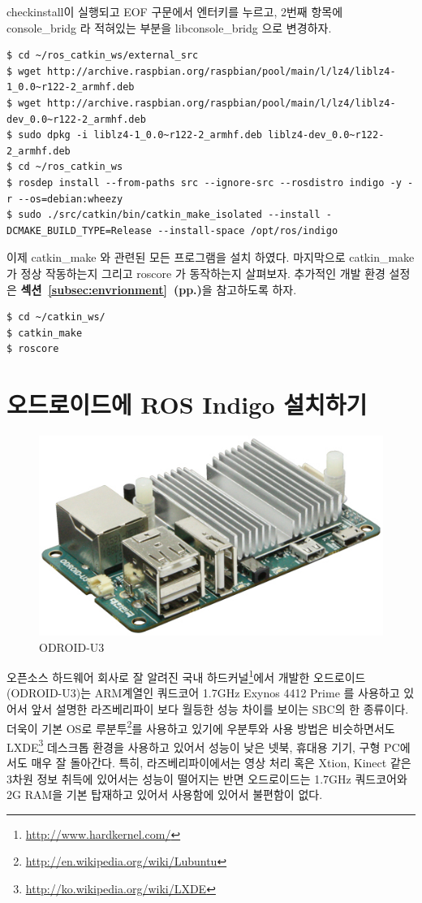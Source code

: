 checkinstall이 실행되고 EOF 구문에서 엔터키를 누르고, 2번째 항목에 console\_bridg 라 적혀있는 부분을 libconsole\_bridg 으로 변경하자.

\vspace{\baselineskip}
\begin{lstlisting}[language=ROS]
$ cd ~/ros_catkin_ws/external_src
$ wget http://archive.raspbian.org/raspbian/pool/main/l/lz4/liblz4-1_0.0~r122-2_armhf.deb
$ wget http://archive.raspbian.org/raspbian/pool/main/l/lz4/liblz4-dev_0.0~r122-2_armhf.deb
$ sudo dpkg -i liblz4-1_0.0~r122-2_armhf.deb liblz4-dev_0.0~r122-2_armhf.deb
$ cd ~/ros_catkin_ws
$ rosdep install --from-paths src --ignore-src --rosdistro indigo -y -r --os=debian:wheezy
$ sudo ./src/catkin/bin/catkin_make_isolated --install -DCMAKE_BUILD_TYPE=Release --install-space /opt/ros/indigo
\end{lstlisting}

이제 catkin\_make 와 관련된 모든 프로그램을 설치 하였다. 마지막으로 catkin\_make 가 정상 작동하는지 그리고 roscore 가 동작하는지 살펴보자. 추가적인 개발 환경 설정은 \textbf{섹션~\ref{subsec:envrionment}~(pp.\pageref{subsec:envrionment})}을 참고하도록 하자.

\vspace{\baselineskip}
\begin{lstlisting}[language=ROS]
$ cd ~/catkin_ws/
$ catkin_make
$ roscore
\end{lstlisting}

\newpage
\section{오드로이드에 ROS Indigo 설치하기}

\begin{figure}[h]
\centering\includegraphics[width=0.45\columnwidth]{pictures/chapter3/odroid.jpg}
\caption{ODROID-U3}
\end{figure}

오픈소스 하드웨어 회사로 잘 알려진 국내 하드커널\footnote{\url{http://www.hardkernel.com/}}에서 개발한 오드로이드(ODROID-U3)는 ARM계열인 쿼드코어 1.7GHz Exynos 4412 Prime 를 사용하고 있어서 앞서 설명한 라즈베리파이 보다 월등한 성능 차이를 보이는 SBC의 한 종류이다. 더욱이 기본 OS로 루분투\footnote{\url{http://en.wikipedia.org/wiki/Lubuntu}}를 사용하고 있기에 우분투와 사용 방법은 비슷하면서도 LXDE\footnote{\url{http://ko.wikipedia.org/wiki/LXDE}} 데스크톱 환경을 사용하고 있어서 성능이 낮은 넷북, 휴대용 기기, 구형 PC에서도 매우 잘 돌아간다. 특히, 라즈베리파이에서는 영상 처리 혹은 Xtion, Kinect 같은 3차원 정보 취득에 있어서는 성능이 떨어지는 반면 오드로이드는 1.7GHz 쿼드코어와 2G RAM을 기본 탑재하고 있어서 사용함에 있어서 불편함이 없다.

